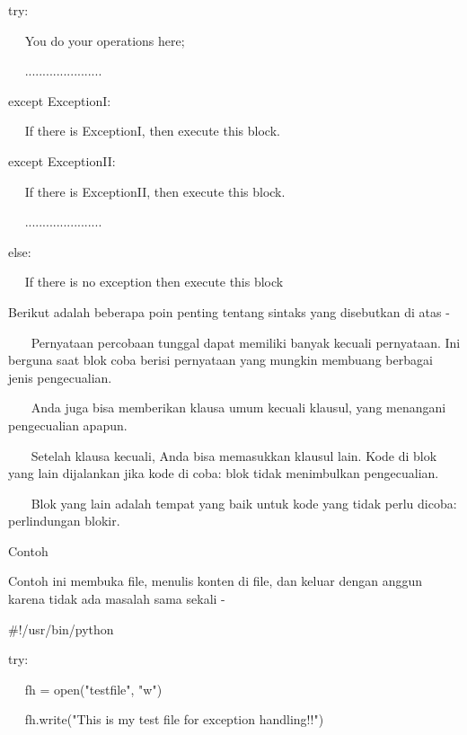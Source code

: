 \vspace{12pt}
try: \par
~~ You do your operations here; \par
~~ ...................... \par
except ExceptionI: \par
~~ If there is ExceptionI, then execute this block. \par
except ExceptionII: \par
~~ If there is ExceptionII, then execute this block. \par
~~ ...................... \par
else: \par
~~ If there is no exception then execute this block \par
\vspace{12pt}
\vspace{12pt}
Berikut adalah beberapa poin penting tentang sintaks yang disebutkan di atas - \par
\vspace{12pt}
~~~ Pernyataan percobaan tunggal dapat memiliki banyak kecuali pernyataan. Ini berguna saat blok coba berisi pernyataan yang mungkin membuang berbagai jenis pengecualian. \par
\vspace{12pt}
~~~ Anda juga bisa memberikan klausa umum kecuali klausul, yang menangani pengecualian apapun. \par
\vspace{12pt}
~~~ Setelah klausa kecuali, Anda bisa memasukkan klausul lain. Kode di blok yang lain dijalankan jika kode di coba: blok tidak menimbulkan pengecualian. \par
\vspace{12pt}
~~~ Blok yang lain adalah tempat yang baik untuk kode yang tidak perlu dicoba: perlindungan blokir. \par
\vspace{12pt}
Contoh \par
\vspace{12pt}
Contoh ini membuka file, menulis konten di file, dan keluar dengan anggun karena tidak ada masalah sama sekali - \par
\vspace{12pt}
 $  \#  $!/usr/bin/python \par
\vspace{12pt}
try: \par
~~ fh = open("testfile", "w") \par
~~ fh.write("This is my test file for exception handling!!") \par

